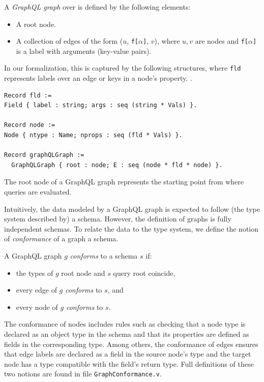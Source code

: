 \begin{definition}
A \emph{GraphQL graph} over \Vals{} is defined by the following elements:
\begin{itemize}
    \item A root node.
    \item A collection of edges of the form ($u$, \texttt{f[}$\alpha$\texttt{]}, $v$), where $u, v$ are nodes and \texttt{f[}$\alpha$\texttt{]} is a label with arguments (key-value pairs).
\end{itemize}
\end{definition}

In our formalization, this is captured by the following structures, where \texttt{fld} represents labels over an edge or keys in a node's property. . 
%
\begin{verbatim}
Record fld := 
Field { label : string; args : seq (string * Vals) }.

Record node := 
Node { ntype : Name; nprops : seq (fld * Vals) }.

Record graphQLGraph := 
  GraphQLGraph { root : node; E : seq (node * fld * node) }.
\end{verbatim}
%
 The root node of a GraphQL graph represents the starting point from where queries are evaluated.

Intuitively, the data modeled by a GraphQL graph is expected to follow (the type system described by) a schema. However, the definition of graphs is fully independent schemas. To relate the data to the type system, we define the notion of \textit{conformance} of a graph \wrt a schema.
%
\begin{definition}
A GraphQL graph $g$ \textit{conforms} to a schema $s$ if:
\begin{itemize}
    \item the types of $g$ root node and $s$ query root coincide, 
    \item every edge of $g$ \textit{conforms} to $s$, and
    \item every node of $g$ \textit{conforms} to $s$.
\end{itemize}
\end{definition}
%
The conformance of nodes includes rules such as checking that a node type is declared as an object type in the schema and that its properties are defined as fields in the corresponding type. Among others, the conformance of edges ensures that edge labels are declared as a field in the source node's type and the target node has a type compatible with the field's return type. Full definitions of these two notions are found in file \texttt{GraphConformance.v}.

